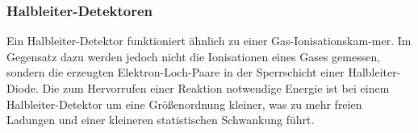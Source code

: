 \subsubsection{Halbleiter-Detektoren}

Ein Halbleiter-Detektor funktioniert ähnlich zu einer Gas-Ionisationskam-mer. Im Gegensatz dazu werden jedoch nicht die Ionisationen eines Gases gemessen, sondern die erzeugten Elektron-Loch-Paare in der Sperrschicht einer Halbleiter-Diode. Die zum Hervorrufen einer Reaktion notwendige Energie ist bei einem Halbleiter-Detektor um eine Größenordnung kleiner, was zu mehr freien Ladungen und einer kleineren statistischen Schwankung führt.